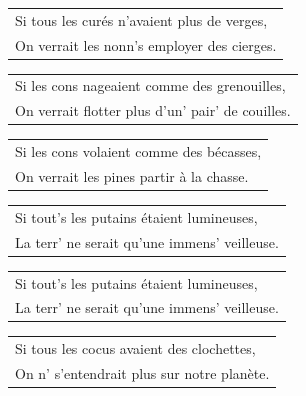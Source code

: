 \documentclass{article}
\begin{document}
\begin{flushleft}
\begin{tabularx}{0.8\textwidth} {
   >{\raggedright\arraybackslash}X}
Si tous les curés n’avaient plus de verges,\\
On verrait les nonn’s employer des cierges.\\
\end{tabularx}
\end{flushleft}\begin{flushleft}
\begin{tabularx}{0.8\textwidth} {
   >{\raggedright\arraybackslash}X}
Si les cons nageaient comme des grenouilles,\\
On verrait flotter plus d’un’ pair’ de couilles.\\
\end{tabularx}
\end{flushleft}\begin{flushleft}
\begin{tabularx}{0.8\textwidth} {
   >{\raggedright\arraybackslash}X}
Si les cons volaient comme des bécasses,\\
On verrait les pines partir à la chasse.\\
\end{tabularx}
\end{flushleft}\begin{flushleft}
\begin{tabularx}{0.8\textwidth} {
   >{\raggedright\arraybackslash}X}
Si tout’s les putains étaient lumineuses,\\
La terr’ ne serait qu’une immens’ veilleuse.\\
\end{tabularx}
\end{flushleft}
\begin{flushleft}
\begin{tabularx}{0.8\textwidth} {
   >{\raggedright\arraybackslash}X}
Si tout’s les putains étaient lumineuses,\\
La terr’ ne serait qu’une immens’ veilleuse.\\
\end{tabularx}
\end{flushleft}
\begin{flushleft}
\begin{tabularx}{0.8\textwidth} {
   >{\raggedright\arraybackslash}X}
Si tous les cocus avaient des clochettes,\\
On n’ s’entendrait plus sur notre planète.\\
\end{tabularx}
\end{flushleft}
\end{document}
